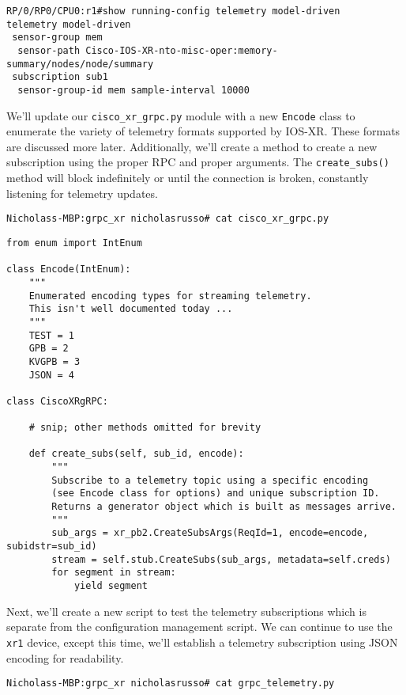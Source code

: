 \begin{verbatim}
RP/0/RP0/CPU0:r1#show running-config telemetry model-driven
telemetry model-driven
 sensor-group mem
  sensor-path Cisco-IOS-XR-nto-misc-oper:memory-summary/nodes/node/summary
 subscription sub1
  sensor-group-id mem sample-interval 10000
\end{verbatim}

We'll update our \verb|cisco_xr_grpc.py| module with a new \verb|Encode|
class to enumerate the variety of telemetry formats supported by IOS-XR\@.
These formats are discussed more later. Additionally, we'll create a method
to create a new subscription using the proper RPC and proper arguments. The
\verb|create_subs()| method will block indefinitely or until the connection
is broken, constantly listening for telemetry updates.

\begin{verbatim}
Nicholass-MBP:grpc_xr nicholasrusso# cat cisco_xr_grpc.py
\end{verbatim}

\begin{verbatim}
from enum import IntEnum

class Encode(IntEnum):
    """
    Enumerated encoding types for streaming telemetry.
    This isn't well documented today ...
    """
    TEST = 1
    GPB = 2
    KVGPB = 3
    JSON = 4

class CiscoXRgRPC:

    # snip; other methods omitted for brevity

    def create_subs(self, sub_id, encode):
        """
        Subscribe to a telemetry topic using a specific encoding
        (see Encode class for options) and unique subscription ID.
        Returns a generator object which is built as messages arrive.
        """
        sub_args = xr_pb2.CreateSubsArgs(ReqId=1, encode=encode, subidstr=sub_id)
        stream = self.stub.CreateSubs(sub_args, metadata=self.creds)
        for segment in stream:
            yield segment
\end{verbatim}

Next, we'll create a new script to test the telemetry subscriptions
which is separate from the configuration management script. We can continue
to use the \verb|xr1| device, except this time, we'll establish a telemetry
subscription using JSON encoding for readability.

\begin{verbatim}
Nicholass-MBP:grpc_xr nicholasrusso# cat grpc_telemetry.py
\end{verbatim}

